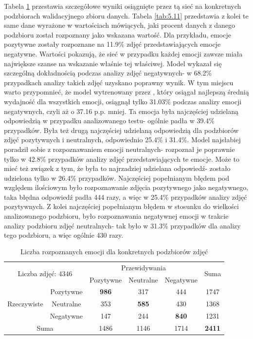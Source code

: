 Tabela \ref{tab:5.10} przestawia szczegółowe wyniki osiągnięte przez tą sieć na konkretnych podzbiorach walidacyjnego zbioru danych. Tabela \ref{tab:5.11} przedstawia z kolei te same dane wyrażone w wartościach mówiących, jaki procent danych z danego podzbioru został rozpoznany jako wskazana wartość. Dla przykładu, emocje pozytywne zostały rozpoznane na 11.9\% zdjęć przedstawiających emocje negatywne. Wartości pokazują, że sieć w przypadku każdej emocji zawsze miała największe szanse na wskazanie właśnie tej właściwej. Model wykazał się szczególną dokładnością podczas analizy zdjęć negatywnych- w 68.2\% przypadkach analizy takich zdjęć uzyskano poprawny wynik. W tym miejscu warto przypomnieć, że model wytrenowany przez \cite{GAD}, który osiągał najlepszą średnią wydajność dla wszystkich emocji, osiągnął tylko 31.03\% podczas analizy emocji negatywnych, czyli aż o 37.16 p.p. mniej. Ta emocja była najczęściej udzielaną odpowiedzią w przypadku analizowanego testu- ogólnie padła w 39.4\% przypadków. Była też drugą najczęściej udzielaną odpowiedzią dla podzbiorów zdjęć pozytywnych i neutralnych, odpowiednio 25.4\% i 31.4\%. Model najsłabiej poradził sobie z rozpoznawaniem emocji neutralnych- rozpoznał je poprawnie tylko w 42.8\% przypadków analizy zdjęć przedstawiających te emocje. Może to mieć też związek z tym, że była to najrzadziej udzielana odpowiedź- zostało udzielona tylko w 26.4\% przypadków. Najczęściej popełnianym błędem pod względem ilościowym było rozpoznawanie zdjęcia pozytywnego jako negatywnego, taka błędna odpowiedź padła 444 razy, a więc w 25.4\% przypadków analizy zdjęć pozytywnych. Z kolei najczęściej popełnianym błędem w stosunku do wielkości analizowanego podzbioru, było rozpoznawania negatywnej emocji w trakcie analizy podzbioru zdjęć neutralnych- tak było w 31.3\% przypadków dla analizy tego podzbioru, a więc ogólnie 430 razy. 

\begin{table}[H]
  \centering
  \caption{Liczba rozpoznanych emocji dla konkretnych podzbiorów zdjęć}
    \begin{tabular}{ |cc|ccc|c| }
    \hline
    \multicolumn{2}{|c|}{\multirow{2}{*}{Liczba zdjęć: 4346}} & \multicolumn{3}{c|}{Przewidywania} & \multirow{2}{*}{Suma} \\
    && Pozytywne & Neutralne & \multicolumn{1}{c|}{Negatywne} & \\
    \hline
    \multirow{3}{*}{Rzeczywiste} & Pozytywne & \textbf{986} & 317 & 444 & 1747 \\
    & Neutralne & 353 & \textbf{585} & 430 & 1368 \\
    & Negatywne & 147 & 244 & \textbf{840} & 1231 \\
    \hline
    \multicolumn{2}{|c|}{Suma} & 1486 & 1146 & 1714 & \textbf{2411} \\
    \hline
    \end{tabular}
  \label{tab:5.10}
\end{table}

